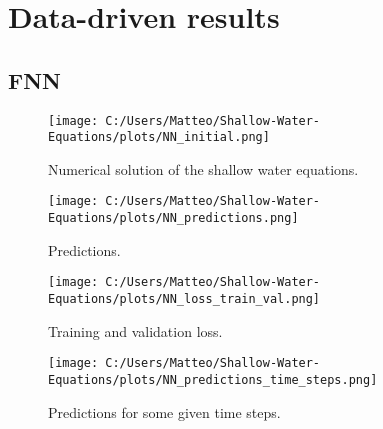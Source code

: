 \section{Data-driven results}

\subsection{FNN}

\begin{figure}[H]
    \centering
    \texttt{[image: C:/Users/Matteo/Shallow-Water-Equations/plots/NN\_initial.png]}
    \caption{Numerical solution of the shallow water equations.}\label{fig:NN_initial}
\end{figure}

\begin{figure}[H]
    \centering
    \texttt{[image: C:/Users/Matteo/Shallow-Water-Equations/plots/NN\_predictions.png]}
    \caption{Predictions.}\label{fig:NN_predictions}
\end{figure}

\begin{figure}[H]
    \centering
    \texttt{[image: C:/Users/Matteo/Shallow-Water-Equations/plots/NN\_loss\_train\_val.png]}
    \caption{Training and validation loss.}\label{fig:NN_loss_train_val}
\end{figure}

\begin{figure}[H]
    \centering
    \texttt{[image: C:/Users/Matteo/Shallow-Water-Equations/plots/NN\_predictions\_time\_steps.png]}
    \caption{Predictions for some given time steps.}\label{fig:NN_predictions_time_steps}
\end{figure}


